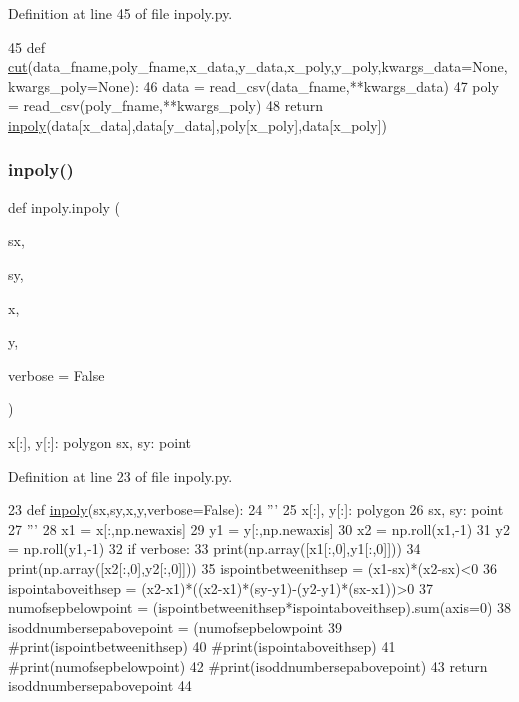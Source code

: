 Definition at line 45 of file inpoly.\+py.


\begin{DoxyCode}
45 \textcolor{keyword}{def }\hyperlink{namespaceinpoly_a6071c414de973f7a1162ae911036c02d}{cut}(data\_fname,poly\_fname,x\_data,y\_data,x\_poly,y\_poly,kwargs\_data=None,kwargs\_poly=None):
46     data = read\_csv(data\_fname,**kwargs\_data)
47     poly = read\_csv(poly\_fname,**kwargs\_poly)
48     \textcolor{keywordflow}{return} \hyperlink{namespaceinpoly}{inpoly}(data[x\_data],data[y\_data],poly[x\_poly],data[x\_poly])
\end{DoxyCode}
\mbox{\label{namespaceinpoly_ad77175adc1811d9ba49b3a6f5753e336}} 
\subsubsection{\texorpdfstring{inpoly()}{inpoly()}}
{\footnotesize\ttfamily def inpoly.\+inpoly (\begin{DoxyParamCaption}\item[{}]{sx,  }\item[{}]{sy,  }\item[{}]{x,  }\item[{}]{y,  }\item[{}]{verbose = {\ttfamily False} }\end{DoxyParamCaption})}

\begin{DoxyVerb}x[:], y[:]: polygon
sx, sy: point
\end{DoxyVerb}
 

Definition at line 23 of file inpoly.\+py.


\begin{DoxyCode}
23 \textcolor{keyword}{def }\hyperlink{namespaceinpoly_ad77175adc1811d9ba49b3a6f5753e336}{inpoly}(sx,sy,x,y,verbose=False):
24     \textcolor{stringliteral}{''' }
25 \textcolor{stringliteral}{    x[:], y[:]: polygon}
26 \textcolor{stringliteral}{    sx, sy: point}
27 \textcolor{stringliteral}{    '''}    
28     x1 = x[:,np.newaxis]
29     y1 = y[:,np.newaxis]
30     x2 = np.roll(x1,-1)
31     y2 = np.roll(y1,-1)
32     \textcolor{keywordflow}{if} verbose:
33         print(np.array([x1[:,0],y1[:,0]]))
34         print(np.array([x2[:,0],y2[:,0]]))
35     ispointbetweenithsep = (x1-sx)*(x2-sx)<0
36     ispointaboveithsep = (x2-x1)*((x2-x1)*(sy-y1)-(y2-y1)*(sx-x1))>0
37     numofsepbelowpoint = (ispointbetweenithsep*ispointaboveithsep).sum(axis=0)
38     isoddnumbersepabovepoint = (numofsepbelowpoint%
39     \textcolor{comment}{#print(ispointbetweenithsep)}
40     \textcolor{comment}{#print(ispointaboveithsep)}
41     \textcolor{comment}{#print(numofsepbelowpoint)}
42     \textcolor{comment}{#print(isoddnumbersepabovepoint)}
43     \textcolor{keywordflow}{return} isoddnumbersepabovepoint
44 
\end{DoxyCode}
\mbox{\label{namespaceinpoly_ac011fa801ecb6cc9429eaf02b25dd1e5}} 
